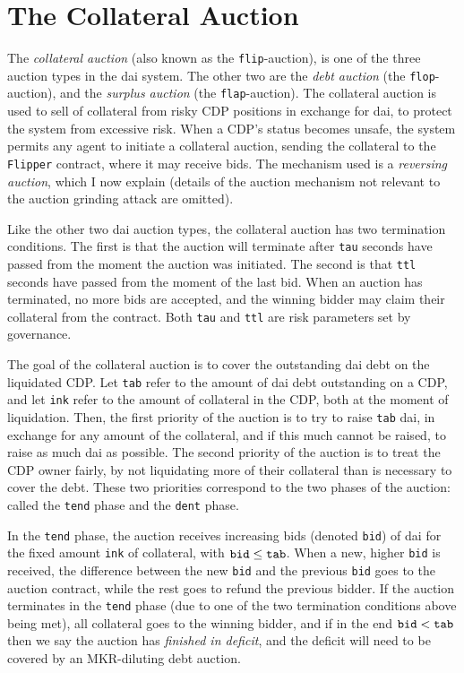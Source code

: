 \documentclass[a4paper,10pt]{article}
\begin{document}
\section{The Collateral Auction}
The \emph{collateral auction} (also known as the {\tt flip}-auction), is one of the three auction types in the dai system. The other two are the \emph{debt auction} (the {\tt flop}-auction), and the \emph{surplus auction} (the {\tt flap}-auction). The collateral auction is used to sell of collateral from risky CDP positions in exchange for dai, to protect the system from excessive risk. When a CDP's status becomes unsafe, the system permits any agent to initiate a collateral auction, sending the collateral to the {\tt Flipper} contract, where it may receive bids. The mechanism used is a \emph{reversing auction}, which I now explain (details of the auction mechanism not relevant to the auction grinding attack are omitted).
\par Like the other two dai auction types, the collateral auction has two termination conditions. The first is that the auction will terminate after {\tt tau} seconds have passed from the moment the auction was initiated. The second is that {\tt ttl} seconds have passed from the moment of the last bid. When an auction has terminated, no more bids are accepted, and the winning bidder may claim their collateral from the contract. Both {\tt tau} and {\tt ttl} are risk parameters set by governance.
\par The goal of the collateral auction is to cover the outstanding dai debt on the liquidated CDP. Let {\tt tab} refer to the amount of dai debt outstanding on a CDP, and let {\tt ink} refer to the amount of collateral in the CDP, both at the moment of liquidation. Then, the first priority of the auction is to try to raise {\tt tab} dai, in exchange for any amount of the collateral, and if this much cannot be raised, to raise as much dai as possible.  The second priority of the auction is to treat the CDP owner fairly, by not liquidating more of their collateral than is necessary to cover the debt. These two priorities correspond to the two phases of the auction: called the {\tt tend} phase and the {\tt dent} phase.
\par In the {\tt tend} phase, the auction receives increasing bids (denoted {\tt bid}) of dai for the fixed amount {\tt ink} of collateral, with ${\tt bid} \leq {\tt tab}$. When a new, higher {\tt bid} is received, the difference between the new {\tt bid} and the previous {\tt bid} goes to the auction contract, while the rest goes to refund the previous bidder. If the auction terminates in the {\tt tend} phase (due to one of the two termination conditions above being met), all collateral goes to the winning bidder, and if in the end ${\tt bid} < {\tt tab}$ then we say the auction has \emph{finished in deficit}, and the deficit will need to be covered by an MKR-diluting debt auction.
\end{document}
